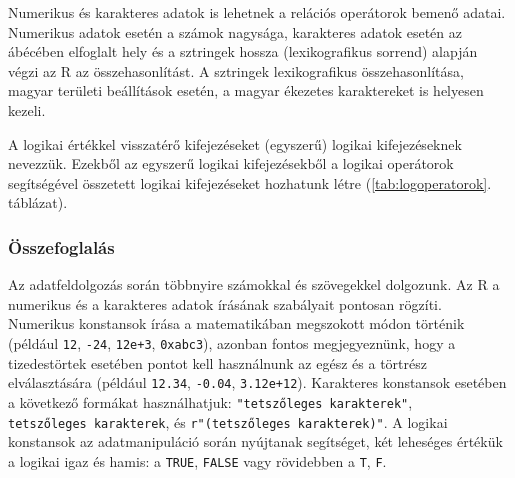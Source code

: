 \documentclass[
]{book}
\makeatletter
\newenvironment{kframe}{%
\medskip{}
\setlength{\fboxsep}{.8em}
 \def\at@end@of@kframe{}%
 \ifinner\ifhmode%
  \def\at@end@of@kframe{\end{minipage}}%
  \begin{minipage}{\columnwidth}%
 \fi\fi%
 \def\FrameCommand##1{\hskip\@totalleftmargin \hskip-\fboxsep
 \colorbox{shadecolor}{##1}\hskip-\fboxsep
     \hskip-\linewidth \hskip-\@totalleftmargin \hskip\columnwidth}%
 \MakeFramed {\advance\hsize-\width
   \@totalleftmargin\z@ \linewidth\hsize
   \@setminipage}}%
 {\par\unskip\endMakeFramed%
 \at@end@of@kframe}
\newenvironment{rmdblock}[1]
  {
  \begin{itemize}
  \renewcommand{\labelitemi}{
    \raisebox{-.7\height}[0pt][0pt]{
      {\setkeys{Gin}{width=3em,keepaspectratio}\texttt{[image: images/\#1]}}
    }
  }
  \setlength{\fboxsep}{1em}
  \begin{kframe}
  \item
  }
  {
  \end{kframe}
  \end{itemize}
  }
\newenvironment{rmdsummary}
  {\begin{rmdblock}{summary}}
  {\end{rmdblock}}
\makeatother
\begin{document}
Numerikus és karakteres adatok is lehetnek a relációs operátorok bemenő adatai. Numerikus adatok esetén a számok nagysága, karakteres adatok esetén az ábécében elfoglalt hely és a sztringek hossza (lexikografikus sorrend) alapján végzi az R az összehasonlítást. A sztringek lexikografikus összehasonlítása, magyar területi beállítások esetén, a magyar ékezetes karaktereket is helyesen kezeli.

A logikai értékkel visszatérő kifejezéseket (egyszerű) logikai kifejezéseknek nevezzük. Ezekből az egyszerű logikai kifejezésekből a logikai operátorok segítségével összetett logikai kifejezéseket hozhatunk létre (\ref{tab:logoperatorok}. táblázat).

\begin{table}

\caption{\label{tab:logoperatorok}Logikai operátorok}
\centering
{}
\end{table}

\hypertarget{az-r-nyelv-3-1-summary}{%
\subsubsection{Összefoglalás}\label{az-r-nyelv-3-1-summary}}

\begin{rmdsummary}
Az adatfeldolgozás során többnyire számokkal és szövegekkel dolgozunk.
Az R a numerikus és a karakteres adatok írásának szabályait pontosan
rögzíti. Numerikus konstansok írása a matematikában megszokott módon
történik (például \texttt{12}, \texttt{-24}, \texttt{12e+3},
\texttt{0xabc3}), azonban fontos megjegyeznünk, hogy a tizedestörtek
esetében pontot kell használnunk az egész és a törtrész elválasztására
(például \texttt{12.34}, \texttt{-0.04}, \texttt{3.12e+12}). Karakteres
konstansok esetében a következő formákat használhatjuk:
\texttt{"tetszőleges\ karakterek"},
\texttt{\textquotesingle{}tetszőleges\ karakterek\textquotesingle{}}, és
\texttt{r"(tetszőleges\ karakterek)"}. A logikai konstansok az
adatmanipuláció során nyújtanak segítséget, két leheséges értékük a
logikai igaz és hamis: a \texttt{TRUE}, \texttt{FALSE} vagy rövidebben a
\texttt{T}, \texttt{F}.
\end{rmdsummary}
\end{document}
